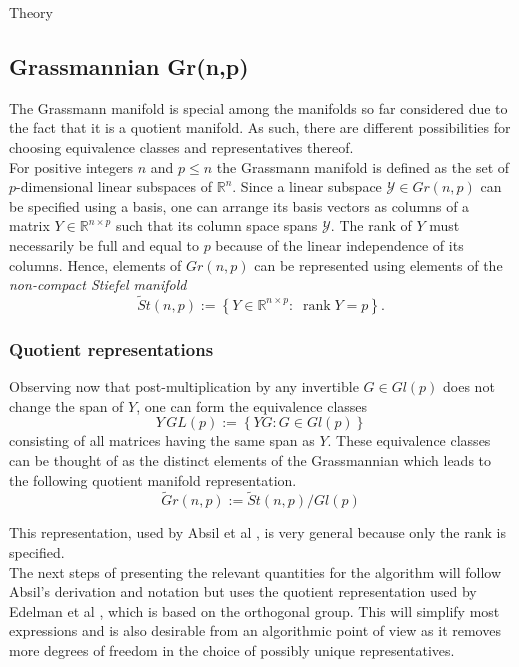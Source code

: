\begin{chapter}{Theory}
\subsection{Grassmannian Gr(n,p)} %
\label{sub:Grassmanian}
The Grassmann manifold is special among the manifolds so far considered due to the fact that it is a quotient manifold. 
As such, there are different possibilities for choosing equivalence classes and representatives thereof.\\

For positive integers $n$ and $p\leq n$ the Grassmann manifold is defined as the set of $p$-dimensional linear subspaces of $\mathbb{R}^n$. 
Since a linear subspace $\mathcal{Y}\in Gr(n,p)$ can be specified using a basis, one can arrange its basis vectors as columns of
a matrix $Y\in\mathbb{R}^{n\times p}$ such that its column space spans $\mathcal{Y}$. The rank of $Y$ must necessarily be full and equal to $p$ because of the linear independence
of its columns. Hence, elements of $Gr(n,p)$ can be represented using elements of the \emph{non-compact Stiefel manifold}
\begin{equation}
    \tilde St(n,p) := \left\lbrace Y\in\mathbb{R}^{n\times p}:\; \operatorname{rank}Y=p\right\rbrace.
\end{equation}

\subsubsection{Quotient representations} %
\label{ssub:Quotient representations}
Observing now that post-multiplication by any invertible $G\in Gl(p)$ does not change the span of $Y$, one can form the equivalence classes
\begin{equation}
    Y\,GL(p) := \left\lbrace YG: G\in Gl(p)\right\rbrace
\end{equation}
consisting of all matrices having the same span as $Y$. These equivalence classes can be thought of as the distinct elements of the Grassmannian which
leads to the following quotient manifold representation.\\
\begin{equation}
    \tilde Gr(n,p):=\tilde St(n,p) / Gl(p)
\end{equation}

This representation, used by Absil et al \cite{AbsilGrassmann}, is very general because only the rank is specified.\\

The next steps of presenting the relevant quantities for the
algorithm will follow Absil's derivation and notation but uses the quotient representation used by Edelman et al \cite{EAS}, which is based on the orthogonal group. This will simplify most expressions and is also desirable from an algorithmic point of view as it removes more degrees of freedom in the choice of possibly unique representatives.\\


\end{chapter}

